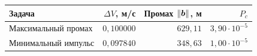 \begin{tabular}{@{}lrrr@{}}\toprule
Задача&$\Delta V$, м/с&Промах $\left\lVert\boldsymbol{b}\right\rVert$, м&$P_c$\\\midrule
Максимальный промах&$0{,}100000$&$629{,}11$&$3{,}90\cdot10^{-5}$\\
Минимальный импульс&$0{,}097840$&$348{,}63$&$1{,}00\cdot10^{-5}$\\
\bottomrule\end{tabular}
